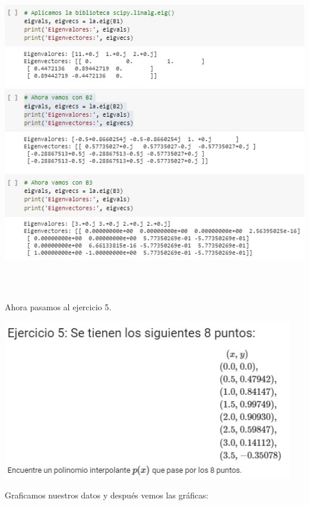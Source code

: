 \documentclass[12pt]{article}
\begin{document}
    \begin{center}
	\includegraphics[height=14cm]{E4.3.jpeg}\\
    \end{center}
    
Ahora pasamos al ejercicio 5.

    \begin{center}
	\includegraphics[height=7cm]{E5.jpeg}\\
    \end{center}
    
Graficamos nuestros datos y después vemos las gráficas:
\end{document}
